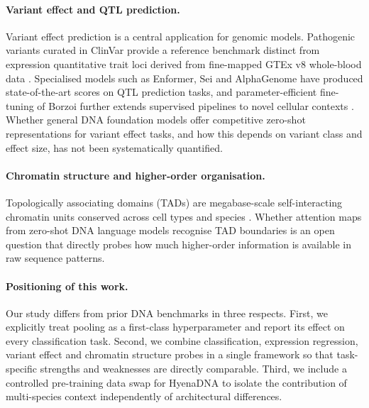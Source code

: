 \paragraph{Variant effect and QTL prediction.}
Variant effect prediction is a central application for genomic models. Pathogenic variants curated in ClinVar \citep{landrum2018clinvar} provide a reference benchmark distinct from expression quantitative trait loci derived from fine-mapped GTEx v8 whole-blood data \citep{gtex2020}. Specialised models such as Enformer, Sei and AlphaGenome \citep{avsec2021enformer,chen2022sei,avsec2025alphagenome} have produced state-of-the-art scores on QTL prediction tasks, and parameter-efficient fine-tuning of Borzoi further extends supervised pipelines to novel cellular contexts \citep{yuan2026borzoi_peft}. Whether general DNA foundation models offer competitive zero-shot representations for variant effect tasks, and how this depends on variant class and effect size, has not been systematically quantified.

\paragraph{Chromatin structure and higher-order organisation.}
Topologically associating domains (TADs) are megabase-scale self-interacting chromatin units conserved across cell types and species \citep{dixon2012topological,lieberman2009hic}. Whether attention maps from zero-shot DNA language models recognise TAD boundaries is an open question that directly probes how much higher-order information is available in raw sequence patterns.

\paragraph{Positioning of this work.}
Our study differs from prior DNA benchmarks in three respects. First, we explicitly treat pooling as a first-class hyperparameter and report its effect on every classification task. Second, we combine classification, expression regression, variant effect and chromatin structure probes in a single framework so that task-specific strengths and weaknesses are directly comparable. Third, we include a controlled pre-training data swap for HyenaDNA to isolate the contribution of multi-species context independently of architectural differences.
